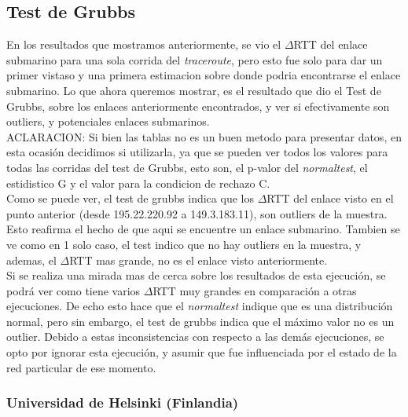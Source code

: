 \subsection{Test de Grubbs}

En los resultados que mostramos anteriormente, se vio el $\Delta$RTT del enlace submarino para una sola corrida del \textit{traceroute}, pero esto fue solo para dar un primer vistaso y una primera estimacion sobre donde podria encontrarse el enlace submarino. Lo que ahora queremos mostrar, es el resultado que dio el Test de Grubbs, sobre los enlaces anteriormente encontrados, y ver si efectivamente son outliers, y potenciales enlaces submarinos.\\

ACLARACION: Si bien las tablas no es un buen metodo para presentar datos, en esta ocasión decidimos si utilizarla, ya que se pueden ver todos los valores para todas las corridas del test de Grubbs, esto son, el p-valor del \textit{normaltest}, el estidistico G y el valor para la condicion de rechazo C. \\

Como se puede ver, el test de grubbs indica que los $\Delta$RTT del enlace visto en el punto anterior (desde 195.22.220.92 a 149.3.183.11), son outliers de la muestra. Esto reafirma el hecho de que aqui se encuentre un enlace submarino. Tambien se ve como en 1 solo caso, el test indico que no hay outliers en la muestra, y ademas, el $\Delta$RTT mas grande, no es el enlace visto anteriormente. \\

Si se realiza una mirada mas de cerca sobre los resultados de esta ejecución, se podrá ver como tiene varios $\Delta$RTT muy grandes en comparación a otras ejecuciones. De echo esto hace que el \textit{normaltest} indique que es una distribución normal, pero sin embargo, el test de grubbs indica que el máximo valor no es un outlier. Debido a estas inconsistencias con respecto a las demás ejecuciones, se opto por ignorar esta ejecución, y asumir que fue influenciada por el estado de la red particular de ese momento.

\subsubsection{Universidad de Helsinki (Finlandia)}

